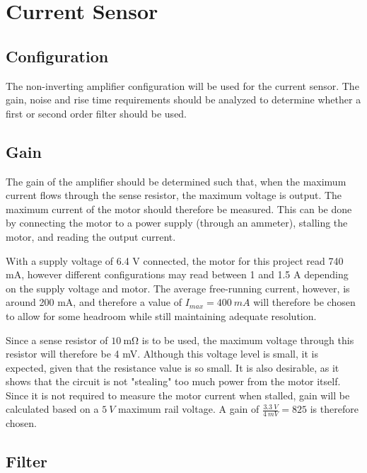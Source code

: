 \graphicspath{{content/2_design/figures/}}
\section{Current Sensor}
\subsection{Configuration}

The non-inverting amplifier configuration will be used for the current sensor. The gain, noise and rise time requirements should be analyzed to determine whether
a first or second order filter should be used.

\subsection{Gain}

The gain of the amplifier should be determined such that, when the maximum current flows through the sense resistor, the maximum voltage is output.
The maximum current of the motor should therefore be measured. This can be done by connecting the motor to a power supply (through an ammeter), stalling the motor, and reading the output current.

With a supply voltage of 6.4 V connected, the motor for this project read 740 mA, however different configurations may read between 1 and 1.5 A depending on the supply voltage and motor.
The average free-running current, however, is around 200 mA, and therefore a value of $I_{max} = \SI{400}{mA}$ will therefore be chosen to allow for some headroom while still maintaining adequate
resolution.

Since a sense resistor of $\SI{10}{\milli\ohm}$ is to be used, the maximum voltage through this resistor will therefore be 4 mV. Although this voltage level is small, it is expected, given that the resistance value is so small.
It is also desirable, as it shows that the circuit is not "stealing" too much power from the motor itself. Since it is not required to measure the motor current when stalled, gain will be calculated
based on a $\SI{5}{V}$ maximum rail voltage. A gain of $\frac{\SI{3.3}{V}}{\SI{4}{mV}} = 825$ is therefore chosen.

\subsection{Filter}

